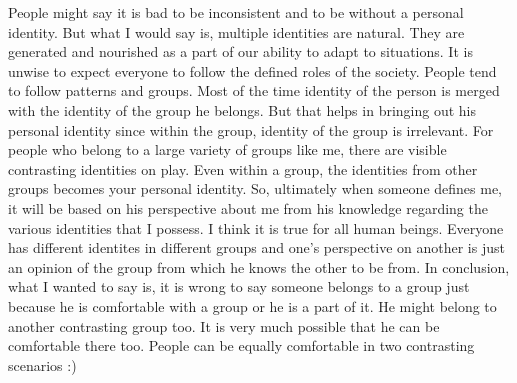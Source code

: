 {People might say it is bad to be inconsistent and to be without a personal identity. But what I would say is, 
multiple identities are natural. They are generated and nourished as a part of our ability to adapt to situations. 
It is unwise to expect everyone to follow the defined roles of the society. People tend to follow patterns and 
groups. Most of the time identity of the person is merged with the identity of the group he belongs. But that 
helps in bringing out his personal identity since within the group, identity of the group is irrelevant. For people 
who belong to a large variety of groups like me, there are visible contrasting identities on play. Even within a 
group, the identities from other groups becomes your personal identity. So, ultimately when someone defines me, 
it will be based on his perspective about me from his knowledge regarding the various identities that I possess. 
I think it is true for all human beings. Everyone has different identites in different groups and one's perspective on 
another is just an opinion of the group from which he knows the other to be from. In conclusion, what I wanted to 
say is, it is wrong to say someone belongs to a group just because he is comfortable with a group or he is a 
part of it. He might belong to another contrasting group too. It is very much possible that he can be comfortable 
there too. People can be equally comfortable in two contrasting scenarios :)
}
\newpage 
